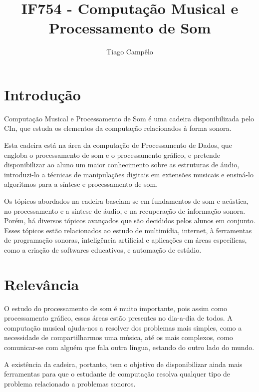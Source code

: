\documentclass{article}
\title{IF754 - Computação Musical e Processamento de Som}
\author{Tiago Campêlo}
\begin{document}
\maketitle

\section{Introdução}
Computação Musical e Processamento de Som é uma cadeira disponibilizada pelo CIn, que estuda os elementos da computação relacionados à forma sonora.

Esta cadeira está na área da computação de Processamento de Dados, que engloba o processamento de som e o processamento gráfico, e pretende disponibilizar ao aluno um maior conhecimento sobre as estruturas de áudio, introduzi-lo a técnicas de manipulações digitais em extensões musicais e ensiná-lo algoritmos para a síntese e processamento de som.

Os tópicos abordados na cadeira baseiam-se em fundamentos de som e acústica, no processamento e a síntese de áudio, e na recuperação de informação sonora. Porém, há diversos tópicos avançados que são decididos pelos alunos em conjunto. Esses tópicos estão relacionados ao estudo de multimídia, internet, à ferramentas de programação sonoras, inteligência artificial e aplicações em áreas específicas, como a criação de softwares educativos, e automação de estúdio.

\section{Relevância}
O estudo do processamento de som é muito importante, pois assim como processamento gráfico, essas áreas estão presentes no dia-a-dia de todos. A computação musical ajuda-nos a resolver dos problemas mais simples, como a necessidade de compartilharmos uma música, até os mais complexos, como comunicar-se com alguém que fala outra língua, estando do outro lado do mundo.

A existência da cadeira, portanto, tem o objetivo de disponibilizar ainda mais ferramentas para que o estudante de computação resolva qualquer tipo de problema relacionado a problemas sonoros.
\end{document}
